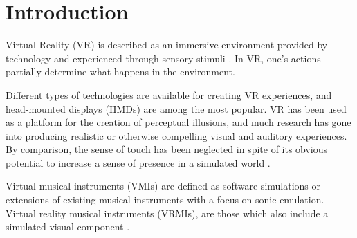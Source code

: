 \documentclass{article}
\title{\papertitle}
\begin{document}
%
\capstartfalse
\maketitle
\capstarttrue
%
\begin{abstract}
This paper presents DigiDrum -- a novel virtual reality musical instrument (VRMI) which consists of a physical drum augmented by virtual reality (VR) to produce enhanced auditory and haptic feedback. We present the design and implementation of the instrument-setup together with the preliminary results of a user study which investigates user's haptic perception of the material stiffness of the drum membrane. We test whether tension in the membrane simulation and sound damping (how fast the sound dies out) change the user’s perception of membrane stiffness. We find that higher values for both tension and damping give the illusion of higher material stiffness in the drum membrane, where the sound damping appears to be the more important factor. Our ultimate goal is twofold: on the one hand we seek to create an instrument which allows for enhanced musical expression possibilities through VR. On the other hand, we seek to investigate how haptics influence user interaction in VRMIs and present a preliminary study on this.
\end{abstract}


\section{Introduction}\label{sec:introduction}
Virtual Reality (VR) is described as an immersive environment provided by technology and experienced through sensory stimuli \cite{Serafin:2017}. In VR, one's actions partially determine what happens in the environment. 

Different types of technologies are available for creating VR experiences, and head-mounted displays (HMDs) are among the most popular. VR has been used as a platform for the creation of perceptual illusions, and much research has gone into producing realistic or otherwise compelling visual and auditory experiences. By comparison, the sense of touch has been neglected in spite of its obvious potential to increase a sense of presence in a simulated world \cite{Serafin:2017}.

Virtual musical instruments (VMIs) are defined as software simulations or extensions of existing musical instruments with a focus on sonic emulation. Virtual reality musical instruments (VRMIs), are those which also include a simulated visual component \cite{Serafin:2016}. 
\end{document}
